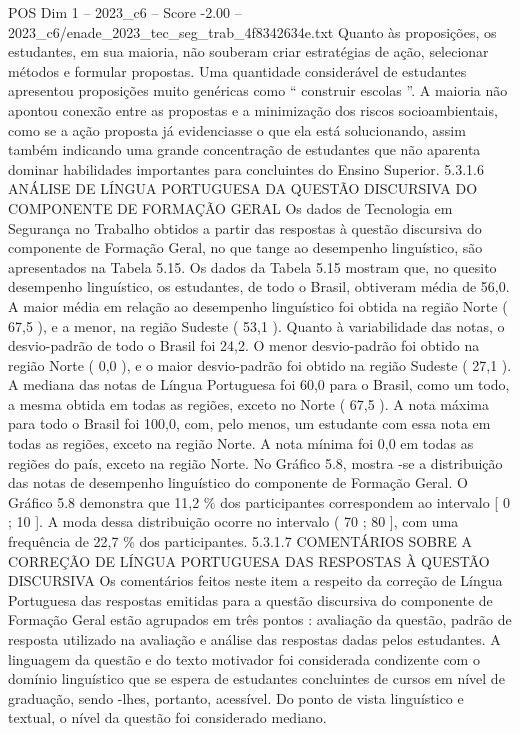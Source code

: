 \begin{textsample}{POS Dim 1 – 2023\_c6 – Score -2.00 – 2023\_c6/enade\_2023\_tec\_seg\_trab\_4f8342634e.txt}
Quanto às proposições, os estudantes, em sua maioria, não souberam criar estratégias de ação, selecionar métodos e formular propostas.
Uma quantidade considerável de estudantes apresentou proposições muito genéricas como “ construir escolas ”.
A maioria não apontou conexão entre as propostas e a minimização dos riscos socioambientais, como se a ação proposta já evidenciasse o que ela está solucionando, assim também indicando uma grande concentração de estudantes que não aparenta dominar habilidades importantes para concluintes do Ensino Superior. 5.3.1.6 ANÁLISE DE LÍNGUA PORTUGUESA DA QUESTÃO DISCURSIVA DO COMPONENTE DE FORMAÇÃO GERAL Os dados de Tecnologia em Segurança no Trabalho obtidos a partir das respostas à questão discursiva do componente de Formação Geral, no que tange ao desempenho linguístico, são apresentados na Tabela 5.15.
Os dados da Tabela 5.15 mostram que, no quesito desempenho linguístico, os estudantes, de todo o Brasil, obtiveram média de 56,0.
A maior média em relação ao desempenho linguístico foi obtida na região Norte ( 67,5 ), e a menor, na região Sudeste ( 53,1 ).
Quanto à variabilidade das notas, o desvio-padrão de todo o Brasil foi 24,2.
O menor desvio-padrão foi obtido na região Norte ( 0,0 ), e o maior desvio-padrão foi obtido na região Sudeste ( 27,1 ).
A mediana das notas de Língua Portuguesa foi 60,0 para o Brasil, como um todo, a mesma obtida em todas as regiões, exceto no Norte ( 67,5 ).
A nota máxima para todo o Brasil foi 100,0, com, pelo menos, um estudante com essa nota em todas as regiões, exceto na região Norte.
A nota mínima foi 0,0 em todas as regiões do país, exceto na região Norte.
No Gráfico 5.8, mostra -se a distribuição das notas de desempenho linguístico do componente de Formação Geral.
O Gráfico 5.8 demonstra que 11,2 \% dos participantes correspondem ao intervalo [ 0 ; 10 ].
A moda dessa distribuição ocorre no intervalo ( 70 ; 80 ], com uma frequência de 22,7 \% dos participantes. 5.3.1.7 COMENTÁRIOS SOBRE A CORREÇÃO DE LÍNGUA PORTUGUESA DAS RESPOSTAS À QUESTÃO DISCURSIVA Os comentários feitos neste item a respeito da correção de Língua Portuguesa das respostas emitidas para a questão discursiva do componente de Formação Geral estão agrupados em três pontos : avaliação da questão, padrão de resposta utilizado na avaliação e análise das respostas dadas pelos estudantes.
A linguagem da questão e do texto motivador foi considerada condizente com o domínio linguístico que se espera de estudantes concluintes de cursos em nível de graduação, sendo -lhes, portanto, acessível.
Do ponto de vista linguístico e textual, o nível da questão foi considerado mediano.

\end{textsample}

